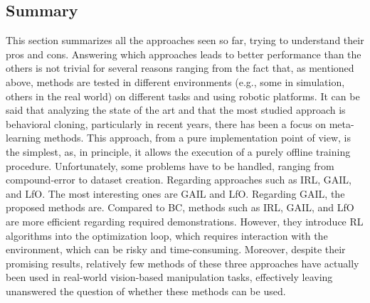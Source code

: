 \subsection{Summary}
\label{sec:summary}
This section summarizes all the approaches seen so far, trying to understand their pros and cons. Answering which approaches leads to better performance than the others is not trivial for several reasons ranging from the fact that, as mentioned above, methods are tested in different environments (e.g., some in simulation, others in the real world) on different tasks and using robotic platforms. It can be said that analyzing the state of the art and that the most studied approach is behavioral cloning, particularly in recent years, there has been a focus on meta-learning methods. This approach, from a pure implementation point of view, is the simplest, as, in principle, it allows the execution of a purely offline training procedure. Unfortunately, some problems have to be handled, ranging from compound-error to dataset creation. Regarding approaches such as IRL, GAIL, and LfO. The most interesting ones are GAIL and LfO. Regarding GAIL, the proposed methods are. Compared to BC, methods such as IRL, GAIL, and LfO are more efficient regarding required demonstrations. However, they introduce RL algorithms into the optimization loop, which requires interaction with the environment, which can be risky and time-consuming. Moreover, despite their promising results, relatively few methods of these three approaches have actually been used in real-world vision-based manipulation tasks, effectively leaving unanswered the question of whether these methods can be used.